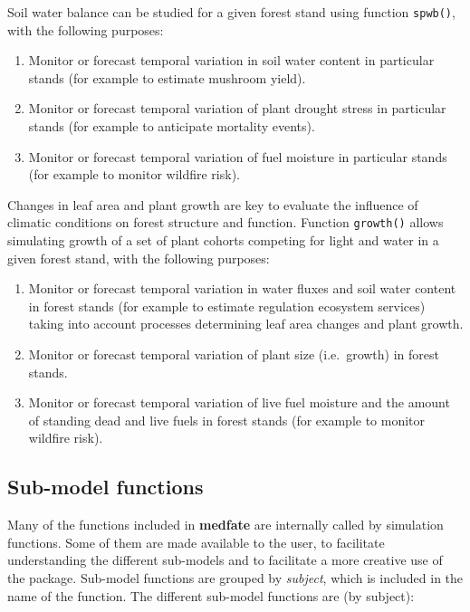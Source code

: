 \documentclass[]{book}
\providecommand{\tightlist}{%
  \setlength{\itemsep}{0pt}\setlength{\parskip}{0pt}}
\begin{document}
Soil water balance can be studied for a given forest stand using function \texttt{spwb()}, with the following purposes:

\begin{enumerate}
\def\labelenumi{\arabic{enumi}.}
\tightlist
\item
  Monitor or forecast temporal variation in soil water content in particular stands (for example to estimate mushroom yield).
\item
  Monitor or forecast temporal variation of plant drought stress in particular stands (for example to anticipate mortality events).
\item
  Monitor or forecast temporal variation of fuel moisture in particular stands (for example to monitor wildfire risk).
\end{enumerate}

Changes in leaf area and plant growth are key to evaluate the influence of climatic conditions on forest structure and function. Function \texttt{growth()} allows simulating growth of a set of plant cohorts competing for light and water in a given forest stand, with the following purposes:

\begin{enumerate}
\def\labelenumi{\arabic{enumi}.}
\tightlist
\item
  Monitor or forecast temporal variation in water fluxes and soil water content in forest stands (for example to estimate regulation ecosystem services) taking into account processes determining leaf area changes and plant growth.
\item
  Monitor or forecast temporal variation of plant size (i.e.~growth) in forest stands.
\item
  Monitor or forecast temporal variation of live fuel moisture and the amount of standing dead and live fuels in forest stands (for example to monitor wildfire risk).
\end{enumerate}

\hypertarget{sub-model-functions}{%
\subsection{Sub-model functions}\label{sub-model-functions}}

Many of the functions included in \textbf{medfate} are internally called by simulation functions. Some of them are made available to the user, to facilitate understanding the different sub-models and to facilitate a more creative use of the package. Sub-model functions are grouped by \emph{subject}, which is included in the name of the function. The different sub-model functions are (by subject):
\end{document}
